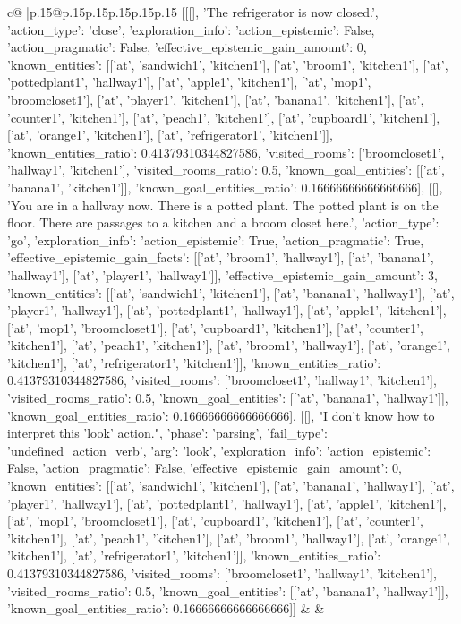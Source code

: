 \documentclass{article}
\begin{document}
{\begin{supertabular}{c@{$\;$}|p{.15\linewidth}@{}p{.15\linewidth}p{.15\linewidth}p{.15\linewidth}p{.15\linewidth}p{.15\linewidth}}
{{{	 [[[], 'The refrigerator is now closed.', {'action_type': 'close', 'exploration_info': {'action_epistemic': False, 'action_pragmatic': False, 'effective_epistemic_gain_amount': 0, 'known_entities': [['at', 'sandwich1', 'kitchen1'], ['at', 'broom1', 'kitchen1'], ['at', 'pottedplant1', 'hallway1'], ['at', 'apple1', 'kitchen1'], ['at', 'mop1', 'broomcloset1'], ['at', 'player1', 'kitchen1'], ['at', 'banana1', 'kitchen1'], ['at', 'counter1', 'kitchen1'], ['at', 'peach1', 'kitchen1'], ['at', 'cupboard1', 'kitchen1'], ['at', 'orange1', 'kitchen1'], ['at', 'refrigerator1', 'kitchen1']], 'known_entities_ratio': 0.41379310344827586, 'visited_rooms': ['broomcloset1', 'hallway1', 'kitchen1'], 'visited_rooms_ratio': 0.5, 'known_goal_entities': [['at', 'banana1', 'kitchen1']], 'known_goal_entities_ratio': 0.16666666666666666}}], [[], 'You are in a hallway now. There is a potted plant. The potted plant is on the floor. There are passages to a kitchen and a broom closet here.', {'action_type': 'go', 'exploration_info': {'action_epistemic': True, 'action_pragmatic': True, 'effective_epistemic_gain_facts': [['at', 'broom1', 'hallway1'], ['at', 'banana1', 'hallway1'], ['at', 'player1', 'hallway1']], 'effective_epistemic_gain_amount': 3, 'known_entities': [['at', 'sandwich1', 'kitchen1'], ['at', 'banana1', 'hallway1'], ['at', 'player1', 'hallway1'], ['at', 'pottedplant1', 'hallway1'], ['at', 'apple1', 'kitchen1'], ['at', 'mop1', 'broomcloset1'], ['at', 'cupboard1', 'kitchen1'], ['at', 'counter1', 'kitchen1'], ['at', 'peach1', 'kitchen1'], ['at', 'broom1', 'hallway1'], ['at', 'orange1', 'kitchen1'], ['at', 'refrigerator1', 'kitchen1']], 'known_entities_ratio': 0.41379310344827586, 'visited_rooms': ['broomcloset1', 'hallway1', 'kitchen1'], 'visited_rooms_ratio': 0.5, 'known_goal_entities': [['at', 'banana1', 'hallway1']], 'known_goal_entities_ratio': 0.16666666666666666}}], [[], "I don't know how to interpret this 'look' action.", {'phase': 'parsing', 'fail_type': 'undefined_action_verb', 'arg': 'look', 'exploration_info': {'action_epistemic': False, 'action_pragmatic': False, 'effective_epistemic_gain_amount': 0, 'known_entities': [['at', 'sandwich1', 'kitchen1'], ['at', 'banana1', 'hallway1'], ['at', 'player1', 'hallway1'], ['at', 'pottedplant1', 'hallway1'], ['at', 'apple1', 'kitchen1'], ['at', 'mop1', 'broomcloset1'], ['at', 'cupboard1', 'kitchen1'], ['at', 'counter1', 'kitchen1'], ['at', 'peach1', 'kitchen1'], ['at', 'broom1', 'hallway1'], ['at', 'orange1', 'kitchen1'], ['at', 'refrigerator1', 'kitchen1']], 'known_entities_ratio': 0.41379310344827586, 'visited_rooms': ['broomcloset1', 'hallway1', 'kitchen1'], 'visited_rooms_ratio': 0.5, 'known_goal_entities': [['at', 'banana1', 'hallway1']], 'known_goal_entities_ratio': 0.16666666666666666}}]] 
	  } 
	   } 
	   } 
	 & & \\ 
 


\end{supertabular}}
\end{document}
